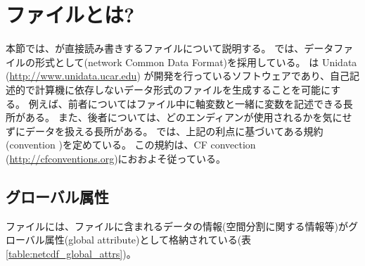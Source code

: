 \section{\scalenetcdf ファイルとは?} \label{sec:netcdf}
本節では、{\scalelib}が直接読み書きする{\scalenetcdf}ファイルについて説明する。
\scalelib では、データファイルの形式として{\netcdf}(network Common Data Format)を採用している。
\Netcdf は Unidata (\url{http://www.unidata.ucar.edu}) が開発を行っているソフトウェアであり、自己記述的で計算機に依存しないデータ形式のファイルを生成することを可能にする。
例えば、前者についてはファイル中に軸変数と一緒に変数を記述できる長所がある。
また、後者については、どのエンディアンが使用されるかを気にせずにデータを扱える長所がある。
\scalelib では、上記の利点に基づいてある規約(\scalenetcdf convention )を定めている。
この規約は、CF convection (\url{http://cfconventions.org})におおよそ従っている。

\subsection{グローバル属性}
\scalenetcdf ファイルには、ファイルに含まれるデータの情報(空間分割に関する情報等)がグローバル属性(global attribute)として格納されている(表\ref{table:netcdf_global_attrs})。

